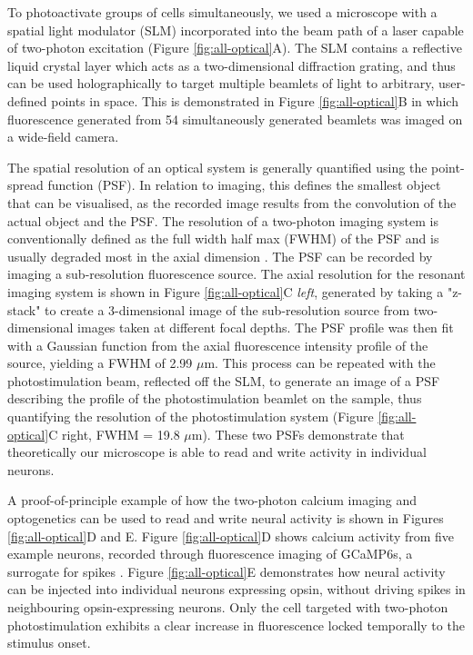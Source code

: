 To photoactivate groups of cells simultaneously, we used a microscope with
a spatial light modulator (SLM) incorporated into the beam path of a laser capable of
two-photon excitation (Figure \ref{fig:all-optical}A). The SLM contains a reflective liquid crystal layer which acts as a two-dimensional diffraction grating, and thus can be used holographically to target multiple beamlets of light to arbitrary, user-defined points in space. This is demonstrated in Figure \ref{fig:all-optical}B in which fluorescence generated from 54 simultaneously generated beamlets was imaged on a wide-field camera.

The spatial resolution of an optical system is generally quantified using the point-spread function (PSF). In relation to imaging, this defines the smallest object that can be visualised, as the recorded image results from the convolution of the actual object and the PSF. The resolution of a two-photon imaging system is conventionally defined as the full width half max (FWHM) of the PSF and is usually degraded most in the axial dimension \cite{shaw_point-spread_1991}. The PSF can be recorded by imaging a sub-resolution fluorescence  source. The axial resolution for the resonant imaging system is shown in Figure \ref{fig:all-optical}C \textit{left}, generated by taking a "z-stack" to create a 3-dimensional image of the sub-resolution source from two-dimensional images taken at different focal depths. The PSF profile was then fit with a Gaussian function from the axial fluorescence intensity profile of the source, yielding a FWHM of 2.99 $\mu$m. This process can be repeated with the photostimulation beam, reflected off the SLM, to generate an image of a PSF describing the profile of the photostimulation beamlet on the sample, thus quantifying the resolution of the photostimulation system (Figure \ref{fig:all-optical}C right, FWHM = 19.8 $\mu$m). These two PSFs demonstrate that theoretically our microscope is able to read and write activity in individual neurons.

A proof-of-principle example of how the two-photon calcium imaging and optogenetics can be used to read and write neural activity is shown in Figures \ref{fig:all-optical}D and E. Figure \ref{fig:all-optical}D shows calcium activity from five example neurons, recorded through fluorescence imaging of GCaMP6s, a surrogate for spikes \cite{chen_ultrasensitive_2013, huang_relationship_2021, grienberger_imaging_2012, packer_simultaneous_2015, stosiek_vivo_2003}. Figure \ref{fig:all-optical}E demonstrates how neural activity can be injected into individual neurons expressing opsin, without driving spikes in neighbouring opsin-expressing neurons. Only the  cell targeted with two-photon photostimulation exhibits a clear increase in fluorescence locked  temporally to the stimulus onset.

